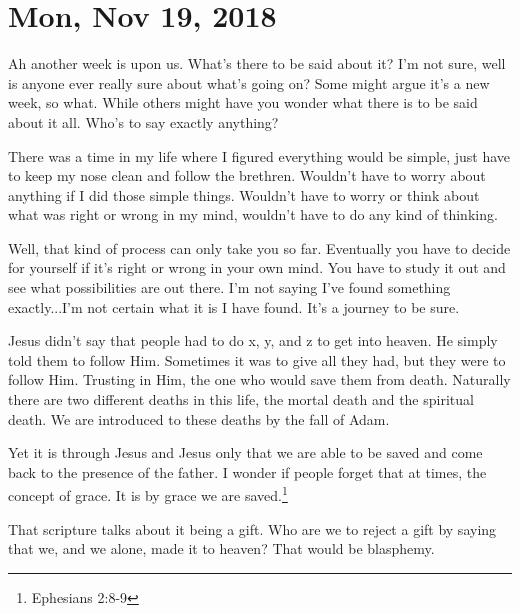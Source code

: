 \section{Mon, Nov 19, 2018}

Ah another week is upon us. What's there to be said about it? I'm not
sure, well is anyone ever really sure about what's going on? Some 
might argue it's a new week, so what. While others might have you wonder
what there is to be said about it all. Who's to say exactly anything?

There was a time in my life where I figured everything would be simple, just
have to keep my nose clean and follow the brethren. Wouldn't have to worry
about anything if I did those simple things. Wouldn't have to worry or
think about what was right or wrong in my mind, wouldn't have to do any
kind of thinking.

Well, that kind of process can only take you so far. Eventually you have
to decide for yourself if it's right or wrong in your own mind. You have
to study it out and see what possibilities are out there. I'm not saying
I've found something exactly...I'm not certain what it is I have found.
It's a journey to be sure.

Jesus didn't say that people had to do x, y, and z to get into heaven. He simply told
them to follow Him. Sometimes it was to give all they had, but they were to follow
Him. Trusting in Him, the one who would save them from death. Naturally there are two
different deaths in this life, the mortal death and the spiritual death. We are
introduced to these deaths by the fall of Adam.

Yet it is through Jesus and Jesus only that we are able to be saved and come back to
the presence of the father. I wonder if people forget that at times, the concept of
grace. It is by grace we are saved.\footnote{Ephesians 2:8-9}

That scripture talks about it being a gift. Who are we to reject a gift by saying
that we, and we alone, made it to heaven? That would be blasphemy.
